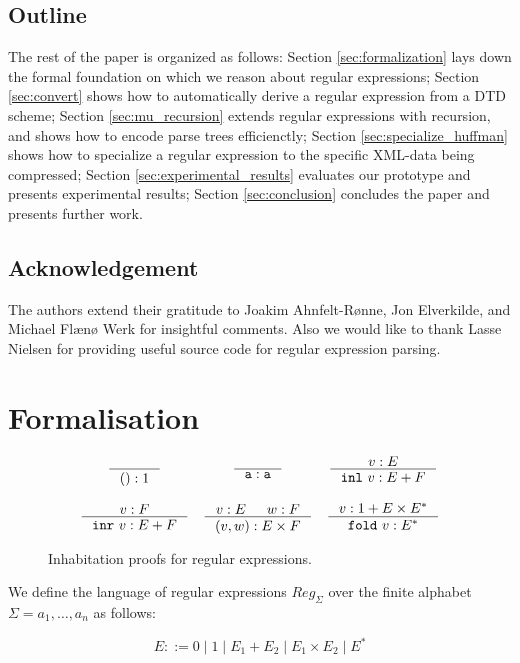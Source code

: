 \documentclass[a4paper, oneside]{memoir}
\theoremstyle{definition}
\begin{document}
\section{Outline}

The rest of the paper is organized as follows:
Section \ref{sec:formalization} lays down the formal foundation on which we reason about regular expressions;
Section \ref{sec:convert} shows how to automatically derive a regular expression from a DTD scheme;
Section \ref{sec:mu_recursion} extends regular expressions with recursion, and shows how to encode parse trees efficienctly;
Section \ref{sec:specialize_huffman} shows how to specialize a regular expression to the specific XML-data being compressed;
Section \ref{sec:experimental_results} evaluates our prototype and presents experimental results;
Section \ref{sec:conclusion} concludes the paper and presents further work.

\section{Acknowledgement}

The authors extend their gratitude to Joakim Ahnfelt-Rønne, Jon Elverkilde, and
Michael Flænø Werk for insightful comments. Also we would like to thank Lasse
Nielsen for providing useful source code for regular expression parsing.

\chapter{Formalisation}
\label{sec:formalisation}

\begin{figure}
\[
\begin{array}{ccc}
  \inference{}{() : 1}
&
  \inference{}{\texttt{a} : \texttt{a}}
&
  \inference{v : E}{\mathtt{inl}\ v : E + F}
\\
\\
  \inference{v : F}{\mathtt{inr}\ v : E + F}
&
  \inference{v : E & w : F}{(v, w) : E \times F}
&
  \inference{v : 1 + E \times E^{\ast}}{\mathtt{fold}\ v : E^{\ast}}
\end{array}
\]
\caption{Inhabitation proofs for regular expressions.}
\label{fig:inhabitation_proofs}
\end{figure}

We define the language of regular expressions $Reg_\Sigma$ over the finite
alphabet $\Sigma = {a_1, \dots, a_n}$ as follows:

\[
    E ::= 0 \; | \; 1 \; | \; E_1 + E_2 \; | \; E_1 \times E_2 \; | \; E^{*}
\]
\end{document}
